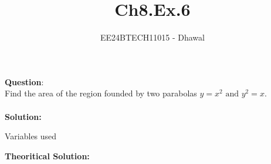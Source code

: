 \documentclass[journal]{IEEEtran}
\begin{document}

\vspace{3cm}

\title{Ch8.Ex.6}
\author{EE24BTECH11015 - Dhawal}
 \maketitle
{\let\newpage\relax\maketitle}

\renewcommand{\thefigure}{\theenumi}
\renewcommand{\thetable}{\theenumi}
\setlength{\intextsep}{10pt} %


\renewcommand{\thetable}{\theenumi}

\textbf{Question}:\\
Find the area of the region founded by two parabolas $y=x^2 \text{ and } y^2=x $.
\\ \\
\textbf{Solution:}\\
\begin{table}[H]
    \centering
    
    \caption{Variables used}
    \label{tab1-1.2-20}
\end{table} 
\textbf{Theoritical Solution: }
\end{document}
